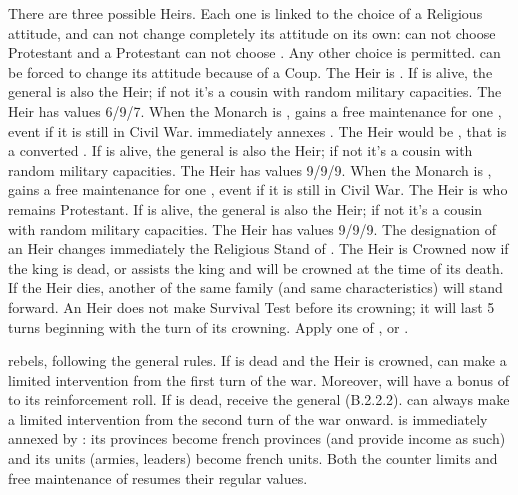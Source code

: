 \begin{digressions}



  \phevnt
  \aparag There are three possible Heirs.  Each one is linked to the choice of
  a Religious attitude, and \FRA can not change completely its attitude on its
  own: \CATHCR can not choose Protestant and a Protestant \FRA can not choose
  \CATHCR.  Any other choice is permitted.  \FRA can be forced to change its
  attitude because of a Coup.
  \aparag[\CATHCR] The Heir is .  If  is alive, the general is also the Heir; if not it's a cousin with
  random military capacities. The Heir has values 6/9/7.  When the Monarch is
  , \FRA gains a free maintenance for one \ARMY
  \faceplus, event if it is still in Civil War. \FRA immediately annexes
  \provinceLorraine.
  \aparag[\CATHCO] The Heir would be , that is a converted
  . If \leaderNavarre is alive, the general is also
  the Heir; if not it's a cousin with random military capacities. The Heir has
  values 9/9/9. When the Monarch is , \FRA gains a free
  maintenance for one \ARMY \faceplus, event if it is still in Civil War.
  \aparag[Protestant] The Heir is  who remains
  Protestant. If \leaderNavarre is alive, the general is also the Heir; if not
  it's a cousin with random military capacities. The Heir has values 9/9/9.
   The designation of an Heir changes
  immediately the Religious Stand of \FRA.
  \bparag The Heir is Crowned now if the king is dead, or assists the king and
  will be crowned at the time of its death.
  \bparag If the Heir dies, another of the same family (and same
  characteristics) will stand forward.
  \bparag An Heir does not make Survival Test before its crowning; it will
  last 5 turns beginning with the turn of its crowning.
  \aparag
  Apply one of ,
   or
  .



  \phevnt
  \aparag \lig rebels, following the general rules.
  \aparag If  is dead and the Heir is crowned, \LIG can
  make a limited intervention from the first turn of the war.  Moreover, \lig
  will have a bonus of  to its reinforcement roll.
  \aparag If  is dead, \lig receive the general
  \leaderMayenne (B.2.2.2).
  \aparag \LIG can always make a limited intervention from the second turn of
  the war onward.
  \aparag \hug is immediately annexed by \FRA: its provinces become french
  provinces (and provide income as such) and its units (armies, leaders)
  become french units. Both the counter limits and free maintenance of \FRA
  resumes their regular values.



\end{digressions}

